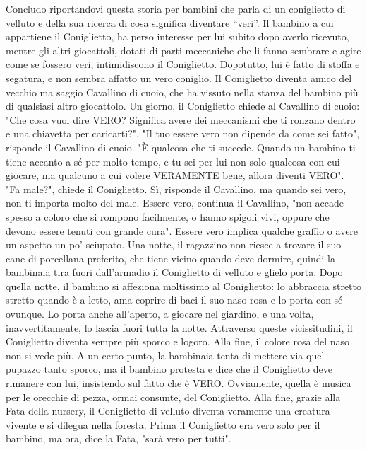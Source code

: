 \documentclass[12pt]{book} %
\begin{document}
Concludo riportandovi questa storia per bambini che parla di un coniglietto di velluto e della sua ricerca di cosa
significa diventare “veri”. Il bambino a cui appartiene il Coniglietto,
ha perso interesse per lui subito dopo averlo ricevuto, mentre gli altri giocattoli, dotati di parti meccaniche che li
fanno sembrare e agire come se fossero veri, intimidiscono il Coniglietto. Dopotutto, lui è fatto di stoffa e segatura,
e non sembra affatto un vero coniglio. Il Coniglietto diventa amico del vecchio ma saggio Cavallino di cuoio, che ha
vissuto nella stanza del bambino più di qualsiasi altro giocattolo. Un giorno, il Coniglietto chiede al Cavallino di
cuoio: "Che cosa vuol dire VERO? Significa avere dei meccanismi che ti ronzano dentro e una
chiavetta per caricarti?". "Il tuo essere vero non dipende da come sei
fatto", risponde il Cavallino di cuoio. "È qualcosa che ti succede. Quando un
bambino ti tiene accanto a sé per molto tempo, e tu sei per lui non solo qualcosa con cui giocare, ma qualcuno a cui
volere VERAMENTE bene, allora diventi VERO". "Fa male?",
chiede il Coniglietto. Sì, risponde il Cavallino, ma quando sei vero, non ti importa molto del male. Essere vero,
continua il Cavallino, "non accade spesso a coloro che si rompono facilmente, o hanno spigoli
vivi, oppure che devono essere tenuti con grande cura". Essere vero implica qualche graffio o
avere un aspetto un po' sciupato. Una notte, il ragazzino non riesce a trovare il suo cane di
porcellana preferito, che tiene vicino quando deve dormire, quindi la bambinaia tira fuori
dall'armadio il Coniglietto di velluto e glielo porta. Dopo quella notte, il bambino si affeziona
moltissimo al Coniglietto: lo abbraccia stretto stretto quando è a letto, ama coprire di baci il suo naso rosa e lo
porta con sé ovunque. Lo porta anche all'aperto, a giocare nel giardino, e una volta,
inavvertitamente, lo lascia fuori tutta la notte. Attraverso queste vicissitudini, il Coniglietto diventa sempre più
sporco e logoro. Alla fine, il colore rosa del naso non si vede più. A un certo punto, la bambinaia tenta di mettere
via quel pupazzo tanto sporco, ma il bambino protesta e dice che il Coniglietto deve rimanere con lui, insistendo sul
fatto che è VERO. Ovviamente, quella è musica per le orecchie di pezza, ormai consunte, del Coniglietto. Alla fine,
grazie alla Fata della nursery, il Coniglietto di velluto diventa veramente una creatura vivente e si dilegua nella
foresta. Prima il Coniglietto era vero solo per il bambino, ma ora, dice la Fata, "sarà vero per
tutti".
\end{document}
